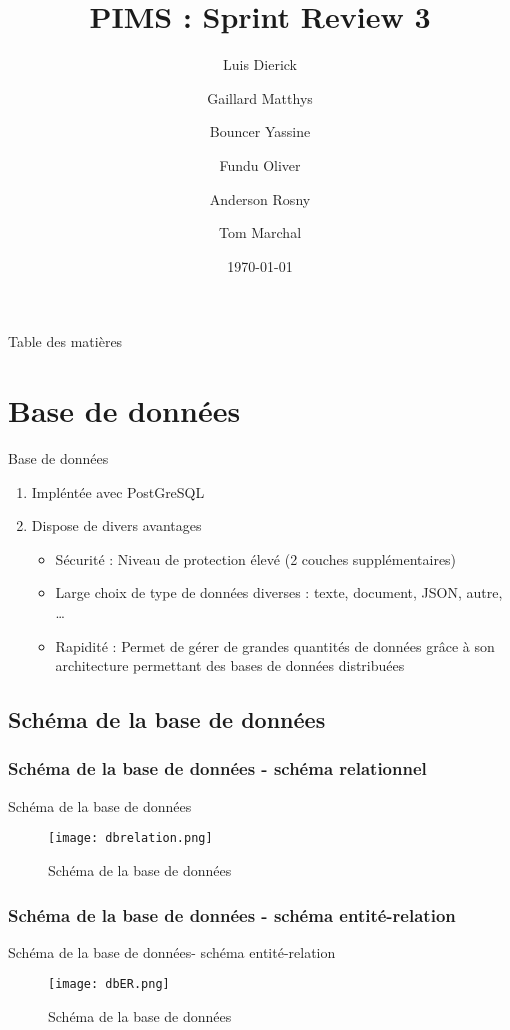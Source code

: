 \documentclass[numbering=fraction]{beamer}
\title{PIMS : Sprint Review 3}
\author[PIMS]{Luis Dierick \and Gaillard Matthys \and Bouncer Yassine \and Fundu Oliver \and Anderson Rosny \and Tom Marchal }
\institute{Université de Namur}
\date{\today}
\begin{document}
\begin{frame}[plain]{}
    \maketitle
\end{frame}

\begin{frame}{Table des matières}
    \tableofcontents
\end{frame}
\section{Base de données}
\begin{frame}{Base de données}
    \begin{enumerate}
        \item Impléntée avec PostGreSQL
        \item Dispose de divers avantages
        \begin{itemize}
            \item Sécurité : Niveau de protection élevé (2 couches supplémentaires)
            \item Large choix de type de données diverses : texte, document, JSON, autre, \dots
            \item Rapidité : Permet de gérer de grandes quantités de données grâce à son architecture permettant des bases de données distribuées
        \end{itemize}
    \end{enumerate}
\end{frame}
\subsection{Schéma de la base de données}
\subsubsection{Schéma de la base de données - schéma relationnel}
\begin{frame}{Schéma de la base de données}
    \begin{figure}
        \centering
        \texttt{[image: dbrelation.png]}
        \caption{Schéma de la base de données}
    \end{figure}
\end{frame}
\subsubsection{Schéma de la base de données - schéma entité-relation}
\begin{frame}{Schéma de la base de données- schéma entité-relation}
    \begin{figure}
        \centering
        \texttt{[image: dbER.png]}
        \caption{Schéma de la base de données}
    \end{figure}
\end{frame}
\end{document}

